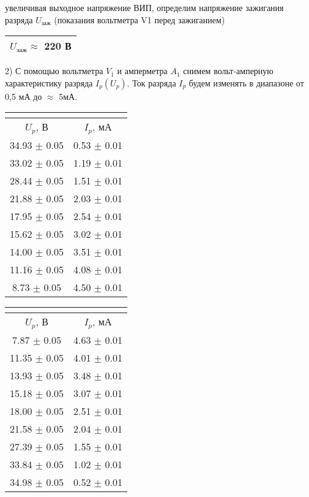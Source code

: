 \documentclass[a4paper,12pt]{article}
\begin{document}
 увеличивая выходное напряжение ВИП, определим напряжение зажигания разряда $U_{\text{заж}}$ (показания вольтметра V1 перед зажиганием) \\

\begin{tabular}{|c|}
	\hline
	$U_{\text{заж}} \approx$ 220 В \\
	\hline
\end{tabular}

\par 2) С помощью вольтметра $V_1$ и амперметра $A_1$ снимем вольт-амперную характеристику разряда $I_p(U_p)$. Ток разряда $I_p$ будем изменять в диапазоне от 0,5 мА до $\approx$ 5мА. 

\begin{tabular}{|c|c|}
	\hline
	\multicolumn{2}{|c|}{\text{При нарастании тока}}\\
	\hline
	$U_p$, В & $I_p$, мА \\
	\hline
	34.93 $\pm$ 0.05 & 0.53 $\pm$ 0.01 \\
	\hline 
	33.02 $\pm$ 0.05 & 1.19 $\pm$ 0.01 \\
	\hline
	28.44 $\pm$ 0.05 & 1.51 $\pm$ 0.01 \\
	\hline
	21.88 $\pm$ 0.05 & 2.03 $\pm$ 0.01 \\
	\hline
	17.95 $\pm$ 0.05 & 2.54 $\pm$ 0.01 \\
	\hline
	15.62 $\pm$ 0.05 & 3.02 $\pm$ 0.01 \\
	\hline
	14.00 $\pm$ 0.05 & 3.51 $\pm$ 0.01 \\
	\hline
	11.16 $\pm$ 0.05 & 4.08 $\pm$ 0.01 \\
	\hline
	8.73 $\pm$ 0.05 & 4.50 $\pm$ 0.01 \\
	\hline
\end{tabular}
\qquad
\begin{tabular}{|c|c|}
	\hline
	\multicolumn{2}{|c|}{\text{При убывании тока}}\\
	\hline
	$U_p$, В & $I_p$, мА \\
	\hline
	7.87 $\pm$ 0.05 & 4.63 $\pm$ 0.01 \\
	\hline
	11.35 $\pm$ 0.05 & 4.01 $\pm$ 0.01 \\
	\hline
	13.93 $\pm$ 0.05 & 3.48 $\pm$ 0.01 \\
	\hline
	15.18 $\pm$ 0.05 & 3.07 $\pm$ 0.01 \\
	\hline
	18.00 $\pm$ 0.05 & 2.51 $\pm$ 0.01 \\
	\hline
	21.58 $\pm$ 0.05 & 2.04 $\pm$ 0.01 \\
	\hline
	27.39 $\pm$ 0.05 & 1.55 $\pm$ 0.01 \\
	\hline
	33.84 $\pm$ 0.05 & 1.02 $\pm$ 0.01 \\
	\hline
	34.98 $\pm$ 0.05 & 0.52 $\pm$ 0.01 \\
	\hline
\end{tabular}
\end{document}
